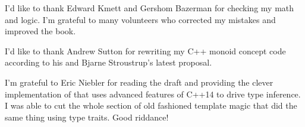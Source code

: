 \noindent
I’d like to thank Edward Kmett and Gershom Bazerman for checking my math
and logic. I'm grateful to many volunteers who corrected my mistakes and improved the book.

\vspace{1.0em}
\noindent
I’d like to thank Andrew Sutton for rewriting my C++ monoid concept
code according to his and Bjarne Stroustrup’s latest proposal.

\vspace{1.0em}
\noindent
I'm grateful to Eric Niebler for reading the draft and providing the
clever implementation of  that uses advanced features of
C++14 to drive type inference. I was able to cut the whole section of
old fashioned template magic that did the same thing using type traits.
Good riddance!